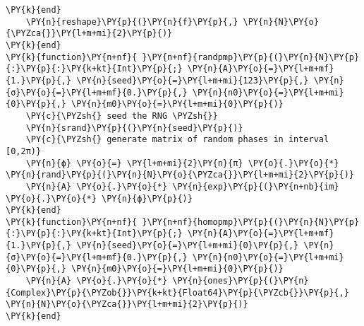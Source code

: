 \begin{Verbatim}[commandchars=\\\{\}]
    \PY{k}{end}
    \PY{n}{reshape}\PY{p}{(}\PY{n}{f}\PY{p}{,} \PY{n}{N}\PY{o}{\PYZca{}}\PY{l+m+mi}{2}\PY{p}{)}
\PY{k}{end}
\PY{k}{function}\PY{n+nf}{ }\PY{n+nf}{randpmp}\PY{p}{(}\PY{n}{N}\PY{p}{:}\PY{p}{:}\PY{k+kt}{Int}\PY{p}{;} \PY{n}{A}\PY{o}{=}\PY{l+m+mf}{1.}\PY{p}{,} \PY{n}{seed}\PY{o}{=}\PY{l+m+mi}{123}\PY{p}{,} \PY{n}{σ}\PY{o}{=}\PY{l+m+mf}{0.}\PY{p}{,} \PY{n}{n0}\PY{o}{=}\PY{l+m+mi}{0}\PY{p}{,} \PY{n}{m0}\PY{o}{=}\PY{l+m+mi}{0}\PY{p}{)}
    \PY{c}{\PYZsh{} seed the RNG \PYZsh{}}
    \PY{n}{srand}\PY{p}{(}\PY{n}{seed}\PY{p}{)}
    \PY{c}{\PYZsh{} generate matrix of random phases in interval [0,2π)}
    \PY{n}{ϕ} \PY{o}{=} \PY{l+m+mi}{2}\PY{n}{π} \PY{o}{.}\PY{o}{*} \PY{n}{rand}\PY{p}{(}\PY{n}{N}\PY{o}{\PYZca{}}\PY{l+m+mi}{2}\PY{p}{)}
    \PY{n}{A} \PY{o}{.}\PY{o}{*} \PY{n}{exp}\PY{p}{(}\PY{n+nb}{im} \PY{o}{.}\PY{o}{*} \PY{n}{ϕ}\PY{p}{)}
\PY{k}{end}
\PY{k}{function}\PY{n+nf}{ }\PY{n+nf}{homopmp}\PY{p}{(}\PY{n}{N}\PY{p}{:}\PY{p}{:}\PY{k+kt}{Int}\PY{p}{;} \PY{n}{A}\PY{o}{=}\PY{l+m+mf}{1.}\PY{p}{,} \PY{n}{seed}\PY{o}{=}\PY{l+m+mi}{0}\PY{p}{,} \PY{n}{σ}\PY{o}{=}\PY{l+m+mf}{0.}\PY{p}{,} \PY{n}{n0}\PY{o}{=}\PY{l+m+mi}{0}\PY{p}{,} \PY{n}{m0}\PY{o}{=}\PY{l+m+mi}{0}\PY{p}{)}
    \PY{n}{A} \PY{o}{.}\PY{o}{*} \PY{n}{ones}\PY{p}{(}\PY{n}{Complex}\PY{p}{\PYZob{}}\PY{k+kt}{Float64}\PY{p}{\PYZcb{}}\PY{p}{,} \PY{n}{N}\PY{o}{\PYZca{}}\PY{l+m+mi}{2}\PY{p}{)}
\PY{k}{end}


\end{Verbatim}
